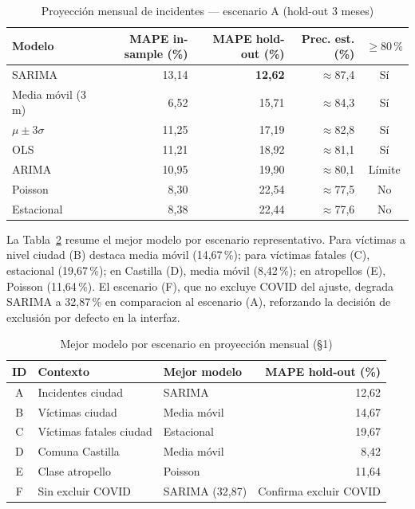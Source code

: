 \begin{table}[H]
	\centering
	\caption{Proyección mensual de incidentes — escenario A (hold-out 3 meses)}
	\label{tab:resultados-seccion1-a}
	\small
	\begin{tabularx}{\linewidth}{@{}l r r r c@{}}
		\toprule
		\textbf{Modelo} & \textbf{MAPE in-sample (\%)} & \textbf{MAPE hold-out (\%)} & \textbf{Prec. est. (\%)} & \textbf{$\geq 80\,\%$} \\
		\midrule
		SARIMA & 13,14 & \textbf{12,62} & $\approx$87,4 & Sí \\
		Media móvil (3 m) & 6,52 & 15,71 & $\approx$84,3 & Sí \\
		$\mu \pm 3\sigma$ & 11,25 & 17,19 & $\approx$82,8 & Sí \\
		OLS & 11,21 & 18,92 & $\approx$81,1 & Sí \\
		ARIMA & 10,95 & 19,90 & $\approx$80,1 & Límite \\
		Poisson & 8,30 & 22,54 & $\approx$77,5 & No \\
		Estacional & 8,38 & 22,44 & $\approx$77,6 & No \\
		\bottomrule
	\end{tabularx}
\end{table}

\clearpage

La Tabla~\ref{tab:resultados-seccion1-escenarios} resume el mejor modelo por escenario representativo. Para víctimas a nivel ciudad (B) destaca media móvil (14,67\,\%); para víctimas fatales (C), estacional (19,67\,\%); en Castilla (D), media móvil (8,42\,\%); en atropellos (E), Poisson (11,64\,\%). El escenario (F), que no excluye COVID del ajuste, degrada SARIMA a 32,87\,\% en comparacion al escenario (A), reforzando la decisión de exclusión por defecto en la interfaz.

\begin{table}[H]
	\centering
	\caption{Mejor modelo por escenario en proyección mensual (§1)}
	\label{tab:resultados-seccion1-escenarios}
	\small
	\begin{tabularx}{\linewidth}{@{}c l l r@{}}
		\toprule
		\textbf{ID} & \textbf{Contexto} & \textbf{Mejor modelo} & \textbf{MAPE hold-out (\%)} \\
		\midrule
		A & Incidentes ciudad & SARIMA & 12,62 \\
		B & Víctimas ciudad & Media móvil & 14,67 \\
		C & Víctimas fatales ciudad & Estacional & 19,67 \\
		D & Comuna Castilla & Media móvil & 8,42 \\
		E & Clase atropello & Poisson & 11,64 \\
		F & Sin excluir COVID & SARIMA (32,87) & Confirma excluir COVID \\
		\bottomrule
	\end{tabularx}
\end{table}

